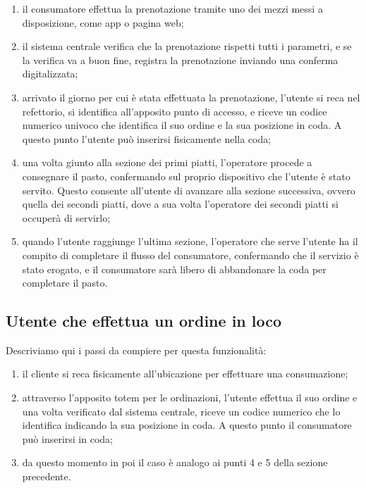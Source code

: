 \documentclass[a4paper, titlepage, 12pt, openright, twoside]{book}
\begin{document}
\begin{enumerate}
	\item il consumatore effettua la prenotazione tramite uno dei mezzi messi a disposizione, come app o pagina web;
	\item il sistema centrale verifica che la prenotazione rispetti tutti i parametri, e se la verifica va a buon fine, registra la prenotazione
		  inviando una conferma digitalizzata;
	\item arrivato il giorno per cui è stata effettuata la prenotazione, l'utente si reca nel refettorio, si identifica all'apposito punto di accesso,
		  e riceve un codice numerico univoco che identifica il suo ordine e la sua posizione in coda. A questo punto l'utente può inserirsi fisicamente nella coda;
	\item una volta giunto alla sezione dei primi piatti, l'operatore procede a consegnare il pasto, confermando sul proprio dispositivo che l'utente è stato servito.
		  Questo consente all'utente di avanzare alla sezione successiva, ovvero quella dei secondi piatti, dove a sua volta l'operatore dei secondi piatti si occuperà di servirlo;
	\item quando l'utente raggiunge l'ultima sezione, l'operatore che serve l'utente ha il compito di completare il flusso del consumatore, confermando che il servizio è stato erogato, e il consumatore sarà libero di abbandonare la coda per completare il pasto.
\end{enumerate}

\subsection{Utente che effettua un ordine in loco}

Descriviamo qui i passi da compiere per questa funzionalità:

\begin{enumerate}
	\item il cliente si reca fisicamente all'ubicazione per effettuare una consumazione;
	\item attraverso l'apposito totem per le ordinazioni, l'utente effettua il suo ordine e una volta verificato dal sistema centrale, riceve un codice numerico che lo identifica indicando la sua posizione in coda. A questo punto il consumatore può inserirsi in coda;
	\item da questo momento in poi il caso è analogo ai punti 4 e 5 della sezione precedente.
\end{enumerate}
\end{document}
